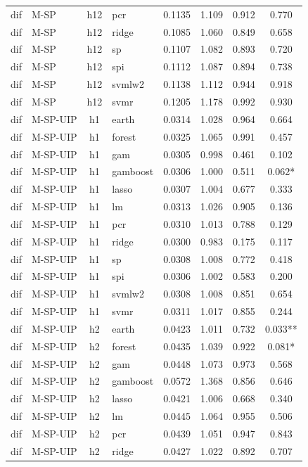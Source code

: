 \begin{ThreePartTable}
\begin{longtable}[t]{llclcccc}
dif & M-SP & h12 & pcr & 0.1135 & 1.109 & 0.912 & 0.770\\
dif & M-SP & h12 & ridge & 0.1085 & 1.060 & 0.849 & 0.658\\
dif & M-SP & h12 & sp & 0.1107 & 1.082 & 0.893 & 0.720\\
dif & M-SP & h12 & spi & 0.1112 & 1.087 & 0.894 & 0.738\\
dif & M-SP & h12 & svmlw2 & 0.1138 & 1.112 & 0.944 & 0.918\\
dif & M-SP & h12 & svmr & 0.1205 & 1.178 & 0.992 & 0.930\\
\addlinespace
dif & M-SP-UIP & h1 & earth & 0.0314 & 1.028 & 0.964 & 0.664\\
dif & M-SP-UIP & h1 & forest & 0.0325 & 1.065 & 0.991 & 0.457\\
dif & M-SP-UIP & h1 & gam & 0.0305 & 0.998 & 0.461 & 0.102\\
dif & M-SP-UIP & h1 & gamboost & 0.0306 & 1.000 & 0.511 & 0.062*\\
dif & M-SP-UIP & h1 & lasso & 0.0307 & 1.004 & 0.677 & 0.333\\
dif & M-SP-UIP & h1 & lm & 0.0313 & 1.026 & 0.905 & 0.136\\
dif & M-SP-UIP & h1 & pcr & 0.0310 & 1.013 & 0.788 & 0.129\\
dif & M-SP-UIP & h1 & ridge & 0.0300 & 0.983 & 0.175 & 0.117\\
dif & M-SP-UIP & h1 & sp & 0.0308 & 1.008 & 0.772 & 0.418\\
dif & M-SP-UIP & h1 & spi & 0.0306 & 1.002 & 0.583 & 0.200\\
dif & M-SP-UIP & h1 & svmlw2 & 0.0308 & 1.008 & 0.851 & 0.654\\
dif & M-SP-UIP & h1 & svmr & 0.0311 & 1.017 & 0.855 & 0.244\\
\addlinespace
dif & M-SP-UIP & h2 & earth & 0.0423 & 1.011 & 0.732 & 0.033**\\
dif & M-SP-UIP & h2 & forest & 0.0435 & 1.039 & 0.922 & 0.081*\\
dif & M-SP-UIP & h2 & gam & 0.0448 & 1.073 & 0.973 & 0.568\\
dif & M-SP-UIP & h2 & gamboost & 0.0572 & 1.368 & 0.856 & 0.646\\
dif & M-SP-UIP & h2 & lasso & 0.0421 & 1.006 & 0.668 & 0.340\\
dif & M-SP-UIP & h2 & lm & 0.0445 & 1.064 & 0.955 & 0.506\\
dif & M-SP-UIP & h2 & pcr & 0.0439 & 1.051 & 0.947 & 0.843\\
dif & M-SP-UIP & h2 & ridge & 0.0427 & 1.022 & 0.892 & 0.707\\

\end{longtable}
\end{ThreePartTable}
